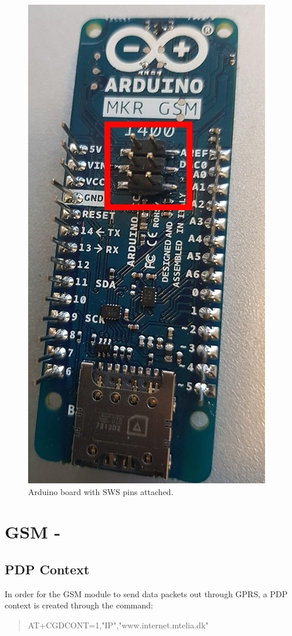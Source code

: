 \begin{figure}
	\centering
	\includegraphics[height=0.4\textheight, angle=270]{gfx/Implementation/MKR1400BoardSWD.jpg}
	\caption{Arduino \MKR board with SWS pins attached.}
	\label{fig:debugpins}
\end{figure}

\section{GSM - \SARA}
\subsection{PDP Context}
In order for the GSM module to send data packets out through GPRS, a PDP context is created through the command:
\begin{quote}
	AT+CGDCONT=1,"IP","www.internet.mtelia.dk"
\end{quote}

